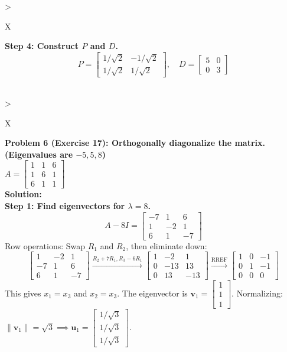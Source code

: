 \documentclass[11pt, letterpaper]{article}
\theoremstyle{definition}
\theoremstyle{remark}
\begin{document}
\begin{tabularx}{\textwidth}{>{\raggedright\arraybackslash}X}
\textbf{Step 4: Construct $P$ and $D$.}
\[ P = \begin{bmatrix} 1/\sqrt{2} & -1/\sqrt{2} \\ 1/\sqrt{2} & 1/\sqrt{2} \end{bmatrix}, \quad D = \begin{bmatrix} 5 & 0 \\ 0 & 3 \end{bmatrix} \] \\
\bottomrule
\end{tabularx}
\vspace{1em}

\begin{tabularx}{\textwidth}{>{\raggedright\arraybackslash}X}
\toprule
\textbf{Problem 6 (Exercise 17): Orthogonally diagonalize the matrix. (Eigenvalues are $-5, 5, 8$)} \\
$A = \begin{bmatrix} 1 & 1 & 6 \\ 1 & 6 & 1 \\ 6 & 1 & 1 \end{bmatrix}$ \\
\midrule
\textbf{Solution:} \\
\textbf{Step 1: Find eigenvectors for $\lambda = 8$.}
\[ A - 8I = \begin{bmatrix} -7 & 1 & 6 \\ 1 & -2 & 1 \\ 6 & 1 & -7 \end{bmatrix} \]
Row operations: Swap $R_1$ and $R_2$, then eliminate down:
\[ \begin{bmatrix} 1 & -2 & 1 \\ -7 & 1 & 6 \\ 6 & 1 & -7 \end{bmatrix} \xrightarrow{R_2+7R_1, R_3-6R_1} \begin{bmatrix} 1 & -2 & 1 \\ 0 & -13 & 13 \\ 0 & 13 & -13 \end{bmatrix} \xrightarrow{\text{RREF}} \begin{bmatrix} 1 & 0 & -1 \\ 0 & 1 & -1 \\ 0 & 0 & 0 \end{bmatrix} \]
This gives $x_1 = x_3$ and $x_2 = x_3$. The eigenvector is $\mathbf{v}_1 = \begin{bmatrix} 1 \\ 1 \\ 1 \end{bmatrix}$.
Normalizing: $\|\mathbf{v}_1\| = \sqrt{3} \implies \mathbf{u}_1 = \begin{bmatrix} 1/\sqrt{3} \\ 1/\sqrt{3} \\ 1/\sqrt{3} \end{bmatrix}$.


\end{tabularx}
\end{document}
